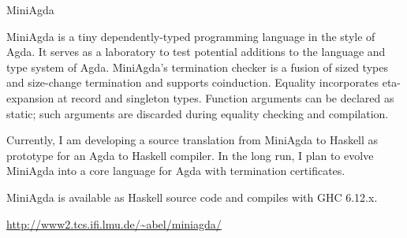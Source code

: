 \documentclass{scrreprt}
\begin{document}
\begin{hcarentry}{MiniAgda}
\makeheader

MiniAgda is a tiny dependently-typed programming language in the style
of Agda.  It serves as a laboratory to test potential additions to the
language and type system of Agda.  MiniAgda's termination checker is a
fusion of sized types and size-change termination and supports
coinduction.  Equality incorporates eta-expansion at record and
singleton types.  Function arguments can be declared as static; such
arguments are discarded during equality checking and compilation.

Currently, I am developing a source translation from MiniAgda to
Haskell as prototype for an Agda to Haskell compiler.  In the long
run, I plan to evolve MiniAgda into a core language for Agda with
termination certificates.

MiniAgda is available as Haskell source code and compiles with GHC
6.12.x.

\FurtherReading
  \url{http://www2.tcs.ifi.lmu.de/\~abel/miniagda/}
\end{hcarentry}
\end{document}
